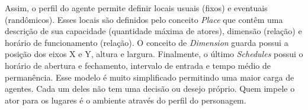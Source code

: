 Assim, o perfil do agente permite definir locais usuais (fixos) e eventuais
(randômicos). Esses locais são definidos pelo conceito \emph{Place} que contêm
uma descrição de sua capacidade (quantidade máxima de atores), dimensão
(relação) e horário de funcionamento (relação). O conceito de \emph{Dimension}
guarda possui a posição dos eixos X e Y, altura e largura. Finalmente, o
último \emph{Schedules} possui o horário de abertura e fechamento, intervalo
de entrada e tempo médio de permanência. Esse modelo é muito simplificado
permitindo uma maior carga de agentes. Cada um deles não tem uma decisão ou
desejo próprio. Quem impele o ator para os lugares é o ambiente através
do perfil do personagem.



\cite{Gutierrez:2007:OVH:1229160.1229164}
